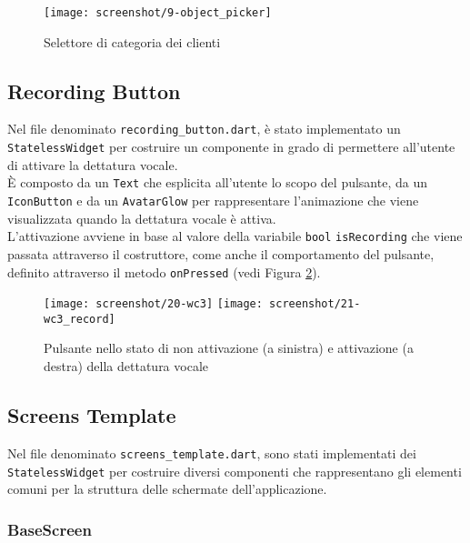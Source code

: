 \begin{figure}[!h] 
    \centering 
    \texttt{[image: screenshot/9-object\_picker]}
    \caption{Selettore di categoria dei clienti}
    \label{fig:object-picker}
\end{figure}

\subsection{Recording Button}
\label{subsec:recording-button}

Nel file denominato \lstinline{recording_button.dart}, è stato implementato un \lstinline{StatelessWidget} per costruire un componente in grado di permettere all'utente di attivare la dettatura vocale.\\
È composto da un \lstinline{Text} \cite{site:text} che esplicita all'utente lo scopo del pulsante, da un \lstinline{IconButton} \cite{site:icon-button} e da un \lstinline{AvatarGlow} \cite{site:avatar-glow} per rappresentare l'animazione che viene visualizzata quando la dettatura vocale è attiva.\\
L'attivazione avviene in base al valore della variabile \lstinline{bool} \lstinline{isRecording} che viene passata attraverso il costruttore, come anche il comportamento del pulsante, definito attraverso il metodo \lstinline{onPressed} \cite{site:on-pressed} (vedi Figura \ref{fig:record-button}).

\begin{figure}[!h] 
    \centering 
    \texttt{[image: screenshot/20-wc3]}
    \hfill
    \texttt{[image: screenshot/21-wc3\_record]} 
    \caption{Pulsante nello stato di non attivazione (a sinistra) e attivazione (a destra) della dettatura vocale}
    \label{fig:record-button}
\end{figure}

\subsection{Screens Template}
\label{subsec:screens-template}

Nel file denominato \lstinline{screens_template.dart}, sono stati implementati dei \lstinline{StatelessWidget} per costruire diversi componenti che rappresentano gli elementi comuni per la struttura delle schermate dell'applicazione.

\subsubsection*{BaseScreen}
\label{subsubsec:base-screen}

